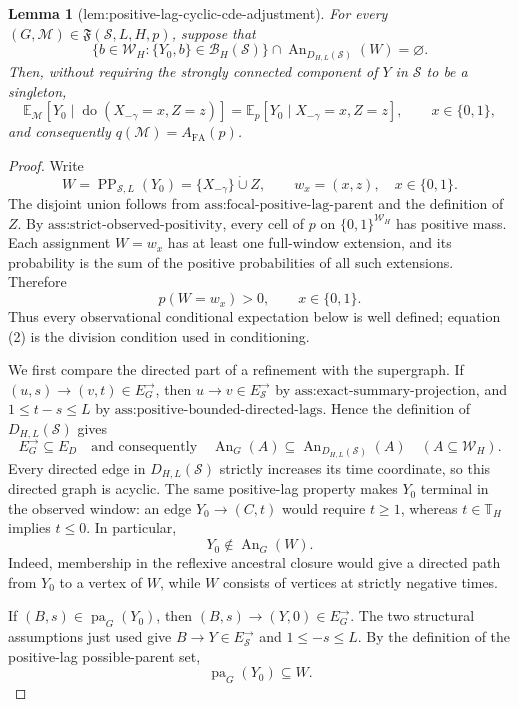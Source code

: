 \documentclass{article}
\newtheorem{lemma}{Lemma}
\begin{document}
\begin{lemma}[lem:positive-lag-cyclic-cde-adjustment]\label{lem:positive-lag-cyclic-cde-adjustment}
For every \((G,\mathcal M)\in\mathfrak F(\mathcal S,L,H,p)\), suppose that
\[
\bigl\{b\in\mathcal W_H:\{Y_0,b\}\in\mathcal B_H(\mathcal S)\bigr\}
\cap\operatorname{An}_{D_{H,L}(\mathcal S)}(W)=\varnothing.
\tag{MC}
\]
Then, without requiring the strongly connected component of \(Y\) in \(\mathcal S\) to be a singleton,
\[
\mathbb E_{\mathcal M}\!\left[Y_0\mid\operatorname{do}(X_{-\gamma}=x,Z=z)\right]
=\mathbb E_p\!\left[Y_0\mid X_{-\gamma}=x,Z=z\right],
\qquad x\in\{0,1\},
\]
and consequently \(q(\mathcal M)=A_{\mathrm{FA}}(p)\).
\end{lemma}
\begin{proof}
Write
\[
W=\operatorname{PP}_{\mathcal S,L}(Y_0)
=\{X_{-\gamma}\}\mathbin{\dot\cup}Z,
\qquad w_x=(x,z),\quad x\in\{0,1\}.
\tag{1}
\]
The disjoint union follows from \(\text{ass:focal-positive-lag-parent}\) and the definition of \(Z\).  By \(\text{ass:strict-observed-positivity}\), every cell of \(p\) on \(\{0,1\}^{\mathcal W_H}\) has positive mass.  Each assignment \(W=w_x\) has at least one full-window extension, and its probability is the sum of the positive probabilities of all such extensions.  Therefore
\[
p(W=w_x)>0,\qquad x\in\{0,1\}.
\tag{2}
\]
Thus every observational conditional expectation below is well defined; equation (2) is the division condition used in conditioning.

We first compare the directed part of a refinement with the supergraph.  If \((u,s)\to(v,t)\in E_G^{\to}\), then \(u\to v\in E_{\mathcal S}^{\to}\) by \(\text{ass:exact-summary-projection}\), and \(1\le t-s\le L\) by \(\text{ass:positive-bounded-directed-lags}\).  Hence the definition of \(D_{H,L}(\mathcal S)\) gives
\[
E_G^{\to}\subseteq E_D
\quad\text{and consequently}\quad
\operatorname{An}_G(A)\subseteq\operatorname{An}_{D_{H,L}(\mathcal S)}(A)
\quad(A\subseteq\mathcal W_H).
\tag{3}
\]
Every directed edge in \(D_{H,L}(\mathcal S)\) strictly increases its time coordinate, so this directed graph is acyclic.  The same positive-lag property makes \(Y_0\) terminal in the observed window: an edge \(Y_0\to(C,t)\) would require \(t\ge1\), whereas \(t\in\mathbb T_H\) implies \(t\le0\).  In particular,
\[
Y_0\notin\operatorname{An}_G(W).
\tag{4}
\]
Indeed, membership in the reflexive ancestral closure would give a directed path from \(Y_0\) to a vertex of \(W\), while \(W\) consists of vertices at strictly negative times.

If \((B,s)\in\operatorname{pa}_G(Y_0)\), then \((B,s)\to(Y,0)\in E_G^{\to}\).  The two structural assumptions just used give \(B\to Y\in E_{\mathcal S}^{\to}\) and \(1\le -s\le L\).  By the definition of the positive-lag possible-parent set,
\[
\operatorname{pa}_G(Y_0)\subseteq W.
\tag{5}
\]


\end{proof}
\end{document}
